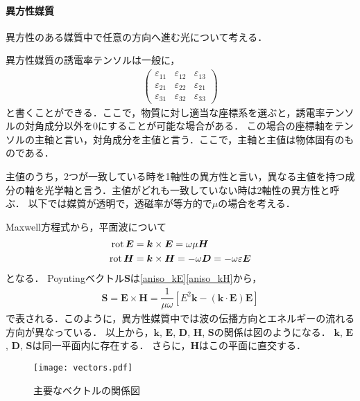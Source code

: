 \paragraph{異方性媒質}
異方性のある媒質中で任意の方向へ進む光について考える．

異方性媒質の誘電率テンソルは一般に，
\begin{align}
  \begin{pmatrix}
    \varepsilon_{11} & \varepsilon_{12} & \varepsilon_{13}\\
    \varepsilon_{21} & \varepsilon_{22} & \varepsilon_{21}\\
    \varepsilon_{31} & \varepsilon_{32} & \varepsilon_{33}
  \end{pmatrix}
\end{align}
と書くことができる．ここで，物質に対し適当な座標系を選ぶと，誘電率テンソルの対角成分以外を0にすることが可能な場合がある．
この場合の座標軸をテンソルの主軸と言い，対角成分を主値と言う．ここで，主軸と主値は物体固有のものである．

主値のうち，2つが一致している時を1軸性の異方性と言い，異なる主値を持つ成分の軸を光学軸と言う．主値がどれも一致していない時は2軸性の異方性と呼ぶ．
以下では媒質が透明で，透磁率が等方的で$\mu$の場合を考える．

Maxwell方程式から，平面波について
\begin{align}
  \operatorname{rot}\boldsymbol{E}&=\boldsymbol{k}\times\boldsymbol{E}=\omega\mu\boldsymbol{H}\label{aniso_kE}\\
  \operatorname{rot}\boldsymbol{H}&=\boldsymbol{k}\times\boldsymbol{H}=-\omega\boldsymbol{D}=-\omega\varepsilon\boldsymbol{E}\label{aniso_kH}
\end{align}
となる．
Poyntingベクトル$\boldsymbol{S}$は\eqref{aniso_kE}\eqref{aniso_kH}から，
\begin{align}
  \boldsymbol{S}=\boldsymbol{E}\times\boldsymbol{H}=\dfrac{1}{\mu\omega}\left[E^2\boldsymbol{k}-(\boldsymbol{k}\cdot\boldsymbol{E})\boldsymbol{E}\right]
\end{align}
で表される．このように，異方性媒質中では波の伝播方向とエネルギーの流れる方向が異なっている．
以上から，$\boldsymbol{k}$, $\boldsymbol{E}$, $\boldsymbol{D}$, $\boldsymbol{H}$, $\boldsymbol{S}$の関係は図のようになる．
$\boldsymbol{k}$, $\boldsymbol{E}$, $\boldsymbol{D}$, $\boldsymbol{S}$は同一平面内に存在する．
さらに，$\boldsymbol{H}$はこの平面に直交する．

\begin{figure}[ht]
  \centering
  \texttt{[image: vectors.pdf]}
  \caption{主要なベクトルの関係図}
  \label{vectors}
\end{figure}

